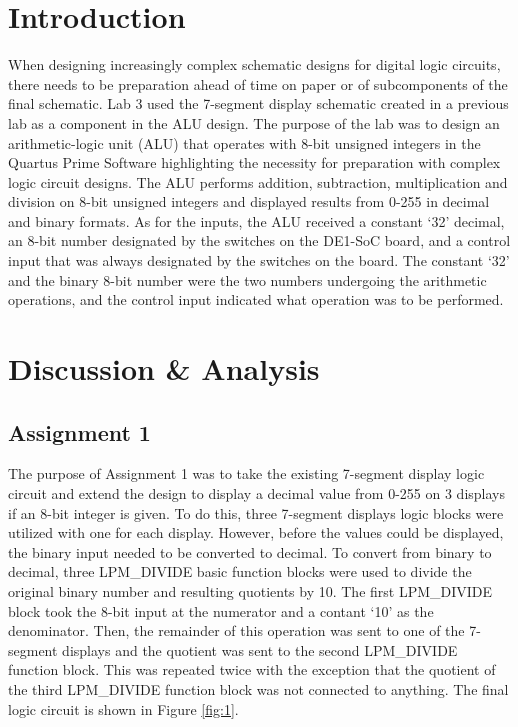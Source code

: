 \documentclass[
	letterpaper, %
	10pt, %
]{CSUniSchoolLabReport}
\begin{document}
\section{Introduction}

\hspace{.5 in} When designing increasingly complex schematic designs for digital logic circuits, there needs to be preparation ahead of time on paper or of subcomponents of the final schematic. Lab 3 used the 7-segment display schematic created in a previous lab as a component in the ALU design. The purpose of the lab was to design an arithmetic-logic unit (ALU) that operates with 8-bit unsigned integers in the Quartus Prime Software highlighting the necessity for preparation with complex logic circuit designs. The ALU performs addition, subtraction, multiplication and division on 8-bit unsigned integers and displayed results from 0-255 in decimal and binary formats. As for the inputs, the ALU received a constant ‘32’ decimal, an 8-bit number designated by the switches on the DE1-SoC board, and a control input that was always designated by the switches on the board. The constant ‘32’ and the binary 8-bit number were the two numbers undergoing the arithmetic operations, and the control input indicated what operation was to be performed.  


\section{Discussion \& Analysis} 

\subsection{Assignment 1}

\hspace{.5 in} The purpose of Assignment 1 was to take the existing 7-segment display logic circuit and extend the design to display a decimal value from 0-255 on 3 displays if an 8-bit integer is given. To do this, three 7-segment displays logic blocks were utilized with one for each display. However, before the values could be displayed, the binary input needed to be converted to decimal. To convert from binary to decimal, three LPM\_DIVIDE basic function blocks were used to divide the original binary number and resulting quotients by 10. The first LPM\_DIVIDE block took the 8-bit input at the numerator and a contant ‘10’ as the denominator. Then, the remainder of this operation was sent to one of the 7-segment displays and the quotient was sent to the second LPM\_DIVIDE function block. This was repeated twice with the exception that the quotient of the third LPM\_DIVIDE function block was not connected to anything. The final logic circuit is shown in Figure \ref{fig:1}. 
\end{document}
